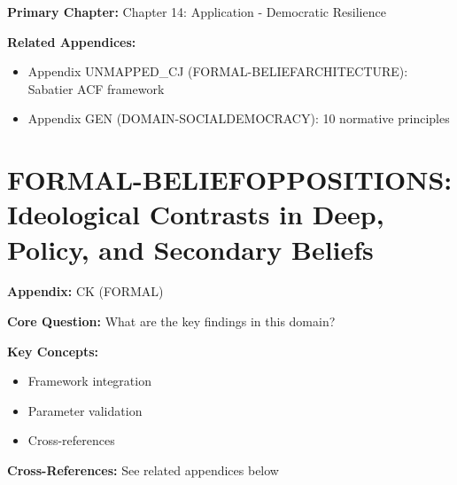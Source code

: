 %
%

\begin{tcolorbox}[colback=purple!5!white, colframe=purple!75!black,
    title=Chapter Linkage]

\textbf{Primary Chapter:} Chapter 14: Application - Democratic Resilience

\textbf{Related Appendices:}
\begin{itemize}[nosep]
\item Appendix UNMAPPED_CJ (FORMAL-BELIEFARCHITECTURE): Sabatier ACF framework
\item Appendix GEN (DOMAIN-SOCIALDEMOCRACY): 10 normative principles
\end{itemize}

\end{tcolorbox}


\chapter{FORMAL-BELIEFOPPOSITIONS: Ideological Contrasts in Deep, Policy, and Secondary Beliefs}
\label{app:ck-beliefoppositions}


\begin{tcolorbox}[colback=blue!5!white, colframe=blue!75!black,
    title=Quick Reference: Appendix UNMAPPED_CK]

\textbf{Appendix:} CK (FORMAL)

\textbf{Core Question:} What are the key findings in this domain?

\textbf{Key Concepts:}
\begin{itemize}[nosep]
\item Framework integration
\item Parameter validation
\item Cross-references
\end{itemize}

\textbf{Cross-References:} See related appendices below
\end{tcolorbox}


